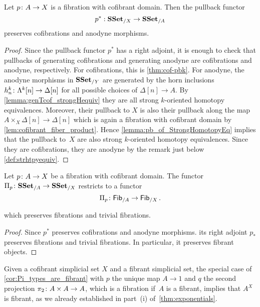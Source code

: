 \documentclass[reqno,10pt,a4paper,oneside,draft]{amsart}
\begin{document}
\begin{proposition}\label{prop:Frobenius}
Let $p \colon A \rightarrow X$ is a fibration with cofibrant domain. Then the pullback functor 
\[
p^* : \mathbf{SSet}_{/X} \rightarrow \mathbf{SSet}_{/A}
\] 
preserves cofibrations and anodyne morphisms.
\end{proposition}


\begin{proof} Since the pullback functor $p^*$ has a right adjoint,  it is enough to check that pullbacks of generating cofibrations and generating anodyne are cofibrations and anodyne, respectively. For cofibrations, this is \cref{thm:cof-pbk}. For anodyne, the anodyne morphisms in $\mathbf{SSet}_{/Y}$ are generated by the horn inclusions $h^k_n \colon \Lambda^{k}[n] \rightarrow \Delta[n]$ for all possible choices of $\Delta[n] \rightarrow A$. By \cref{lemma:genTcof_strongHequiv} they are all strong $k$-oriented homotopy equivalences. Moreover, their pullback to $X$ is also their pullback along the map $A \times_X \Delta[n] \rightarrow \Delta[n]$ which is again a fibration with cofibrant domain by \cref{lem:cofibrant_fiber_product}. Hence  \cref{lemma:pb_of_StrongHomotopyEq} implies that the pullback 
to~$X$ are also strong $k$-oriented homotopy equivalences. Since they are cofibrations, they are anodyne by the remark just below \cref{def:strhtpyequiv}.
\end{proof}



\begin{corollary}\label{cor:Pi_types_are_fibrant}
Let $p \colon A \rightarrow X$ be a fibration with cofibrant domain. The functor $\Pi_p \colon \mathbf{SSet}_{/A} \to \mathbf{SSet}_{/X}$ restricts to a functor
\[
\Pi_p \colon \mathsf{Fib}_{/A}  \to \mathsf{Fib}_{/X} \, .
\]

which preserves fibrations and trivial fibrations.

\end{corollary}

\begin{proof}
Since $p^*$ preserves cofibrations and anodyne morphisms. its right adjoint $p_*$ preserves fibrations and trivial fibrations. In particular, it preserves fibrant objects.
\end{proof}


Given a cofibrant simplicial set $X$ and a fibrant simplicial set, the special case of \cref{cor:Pi_types_are_fibrant} with $p$   the unique map $A \to 1$ and $q$ the second projection 
$\pi_2 \colon A \times A \to A$, which is a fibration if~$A$ is a  fibrant, implies that $A^X$ is fibrant, as we already established in part~(i) 
of~\cref{thm:exponentials}. 
\end{document}
